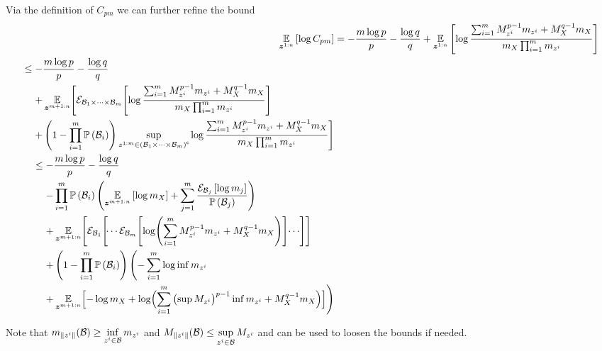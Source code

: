 \begin{proofE}
\begin{small}
\begin{align}
\begin{split}
			\end{split}
		\end{align}
	\end{small}
	Via the definition of $C_{pm}$ we can further refine the bound
	\begin{align*}
		\expectation{\log C_{pm}}{\observationRV{}{1:n}} & =-\frac{m\log p}{p}-\frac{\log q}{q}+\expectation{\log\frac{\sum_{i=1}^{m} M_{\observation{}{i}}^{p-1}m_{\observation{}{i}}+M_{\states{}}^{q-1}m_{\states{}}}{m_{\states{}}\prod_{i=1}^{m}m_{\observation{}{i}}}}{\observationRV{}{1:n}}\\
		\begin{split}
			& \leq-\frac{m\log p}{p}-\frac{\log q}{q}\\
			& \phantomeq+\E_{\observationRV{}{m+1:n}}\Biggl[\partexp_{\subSpace_1\times\cdots\times\subSpace_m}\Biggl[
			\log\frac{\sum_{i=1}^{m}M_{\observation{}{i}}^{p-1}m_{\observation{}{i}}+M_{\states{}}^{q-1}m_{\states{}}}{m_{\states{}}\prod_{i=1}^{m}m_{\observation{}{i}}}\Biggr] \\
			&\phantomeq
			+\left(1-\prod_{i=1}^m\measure{\subSpace_i}\right)\sup_{\observation{}{1:m}\in\stcomp{{\left(\subSpace_1\times\cdots\times\subSpace_m\right)}}}
			\log\frac{\sum_{i=1}^{m} M_{\observation{}{i}}^{p-1}m_{\observation{}{i}}+M_{\states{}}^{q-1}m_{\states{}}}{m_{\states{}}\prod_{i=1}^{m}m_{\observation{}{i}}}\Biggr]
		\end{split}\\
		\begin{split}
			& \leq-\frac{m\log p}{p}-\frac{\log q}{q}\\
			& \phantomeq
			-\prod_{i=1}^m\measure{\subSpace_i}\Biggl(\expectation{\log m_{\states{}}}{\observationRV{}{m+1:n}}
			+\sum_{j=1}^m\frac{\partialexpectation{\log m_j}{\subSpace_j}}{\measure{\subSpace_j}}\Biggr)          \\
			& \phantomeq
			+\E_{\observationRV{}{m+1:n}}\Biggl[\partexp_{\subSpace_1}\Biggl[\dotsi\partexp_{\subSpace_m}\Biggl[
			\log \Biggl(\sum_{i=1}^{m} M_{\observation{}{i}}^{p-1}m_{\observation{}{i}}
			+M_{\states{}}^{q-1}m_{\states{}}\Biggr)\Biggr]\dotsi\Biggr]\Biggr]                                   \\
			& \phantomeq
			+\left(1-\prod_{i=1}^m\measure{\subSpace_i}\right)\Biggl(-\sum_{i=1}^m\log \inf m_{\observation{}{i}} \\
			& \phantomeq
			+\E_{\observationRV{}{m+1:n}}\Bigl[-\log m_{\states{}}
			+\log\Bigl(\sum_{i=1}^{m}\left(\sup M_{\observation{}{i}}\right)^{p-1}\inf m_{\observation{}{i}}
			+M_{\states{}}^{q-1}m_{\states{}}\Bigr)\Bigr]\Biggr)
		\end{split}
	\end{align*}
\end{proofE}
Note that $m_{\lVert z_{}^{i}\rVert}(\mathcal B)\geq \inf\limits_{z_{}^{i}\in\mathcal B}m_{z_{}^{i}}$ and $M_{\lVert z_{}^{i}\rVert}(\mathcal B)\leq \sup\limits_{z_{}^{i}\in\mathcal B}M_{z_{}^{i}}$ and can be used to loosen the bounds if needed.

